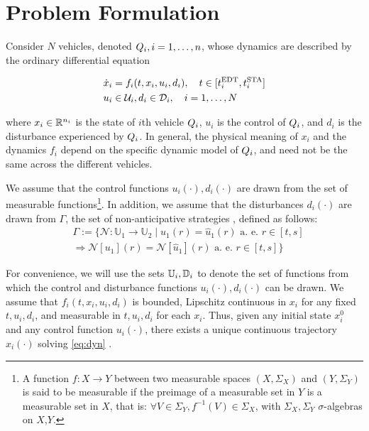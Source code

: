 \section{Problem Formulation \label{sec:formulation}}
Consider $N$ vehicles, denoted $Q_i, i = 1,\ldots,n$, whose dynamics are described by the ordinary differential equation

\begin{equation}
\label{eq:dyn}
\begin{aligned}
\dot{x}_i &= f_i(t, x_i, u_i, d_i), \quad t \in [t^\text{EDT}_i, t^\text{STA}_i] \\
u_i &\in \mathcal{U}_i, d_i \in \mathcal{D}_i, \quad i = 1,\ldots, N
\end{aligned}
\end{equation}

\noindent where $x_i \in \mathbb{R}^{n_i}$ is the state of $i$th vehicle $Q_i$, $u_i$ is the control of $Q_i$, and $d_i$ is the disturbance experienced by $Q_i$. In general, the physical meaning of $x_i$ and the dynamics $f_i$ depend on the specific dynamic model of $Q_i$, and need not be the same across the different vehicles.

We assume that the control functions $u_i(\cdot), d_i(\cdot)$ are drawn from the set of measurable functions\footnote{
A function $f:X\to Y$ between two measurable spaces $(X,\Sigma_X)$ and $(Y,\Sigma_Y)$ is said to be measurable if the preimage of a measurable set in $Y$ is a measurable set in $X$, that is: $\forall V\in\Sigma_Y, f^{-1}(V)\in\Sigma_X$, with $\Sigma_X,\Sigma_Y$ $\sigma$-algebras on $X$,$Y$.}. In addition, we assume that the disturbances $d_i(\cdot)$ are drawn from $\Gamma$, the set of non-anticipative strategies \cite{Mitchell05}, defined as follows:
\begin{equation}
\begin{aligned}
& \Gamma := \{\mathcal{N}: \mathbb{U}_1 \rightarrow \mathbb{U}_2 \mid  u_1(r) = \hat{u}_1(r) \text{ a. e. } r\in[t,s] \\
& \Rightarrow \mathcal{N}[u_1](r) = \mathcal{N}[\hat{u}_1](r) \text{ a. e. } r\in[t,s]\}
\end{aligned}
\end{equation}

For convenience, we will use the sets $\mathbb{U}_i, \mathbb{D}_i$ to denote the set of functions from which the control and disturbance functions $u_i(\cdot), d_i(\cdot)$ can be drawn. We assume that $f_i(t,x_i, u_i, d_i)$ is bounded, Lipschitz continuous in $x_i$ for any fixed $t, u_i, d_i$, and measurable in $t, u_i, d_i$ for each $x_i$. Thus, given any initial state $x_i^0$ and any control function $u_i(\cdot)$, there exists a unique continuous trajectory $x_i(\cdot)$ solving \eqref{eq:dyn} \cite{Coddington55}.


